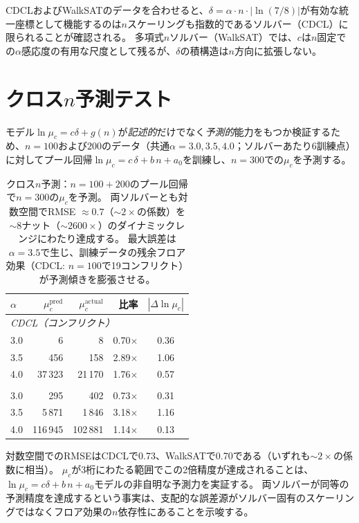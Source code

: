 \documentclass[11pt,a4paper]{article}
\newcommand{\mc}{\mu_c}
\begin{document}
CDCLおよびWalkSATのデータを合わせると、$\delta = \alpha \cdot n \cdot |\!\ln(7/8)|$が有効な統一座標として機能するのは$n$スケーリングも指数的であるソルバー（CDCL）に限られることが確認される。
多項式$n$ソルバー（WalkSAT）では、$c$は$n$固定での$\alpha$感応度の有用な尺度として残るが、$\delta$の積構造は$n$方向に拡張しない。


\section{クロス$n$予測テスト}
\label{app:prediction}

モデル$\ln \mc = c\delta + g(n)$が\emph{記述的}だけでなく\emph{予測的}能力をもつか検証するため、$n = 100$および$200$のデータ（共通$\alpha = 3.0, 3.5, 4.0$；ソルバーあたり6訓練点）に対してプール回帰$\ln \mc = c\,\delta + b\,n + a_0$を訓練し、$n = 300$での$\mc$を予測する。

\begin{table}[h]
\centering
\begin{tabular}{lrrrc}
\toprule
$\alpha$ & $\mc^{\text{pred}}$ & $\mc^{\text{actual}}$
  & 比率 & $|\Delta\ln\mc|$ \\
\midrule
\multicolumn{5}{l}{\textit{CDCL（コンフリクト）}} \\
3.0  & 6       & 8       & 0.70$\times$  & 0.36 \\
3.5  & 456     & 158     & 2.89$\times$  & 1.06 \\
4.0  & 37\,323 & 21\,170 & 1.76$\times$  & 0.57 \\
\addlinespace
\multicolumn{5}{l}{\textit{WalkSAT（フリップ）}} \\
3.0  & 295     & 402     & 0.73$\times$  & 0.31 \\
3.5  & 5\,871  & 1\,846  & 3.18$\times$  & 1.16 \\
4.0  & 116\,945 & 102\,881 & 1.14$\times$ & 0.13 \\
\bottomrule
\end{tabular}
\caption{クロス$n$予測：$n = 100{+}200$のプール回帰で$n = 300$の$\mc$を予測。
両ソルバーとも対数空間でRMSE $\approx 0.7$（$\sim\! 2\times$の係数）を$\sim\! 8$ナット（$\sim\! 2600\times$）のダイナミックレンジにわたり達成する。
最大誤差は$\alpha = 3.5$で生じ、訓練データの残余フロア効果（CDCL: $n = 100$で19コンフリクト）が予測傾きを膨張させる。}
\label{tab:prediction}
\end{table}

対数空間でのRMSEはCDCLで0.73、WalkSATで0.70である（いずれも$\sim\!2\times$の係数に相当）。
$\mc$が3桁にわたる範囲でこの2倍精度が達成されることは、$\ln \mc = c\delta + b\,n + a_0$モデルの非自明な予測力を実証する。
両ソルバーが同等の予測精度を達成するという事実は、支配的な誤差源がソルバー固有のスケーリングではなくフロア効果の$n$依存性にあることを示唆する。
\end{document}
